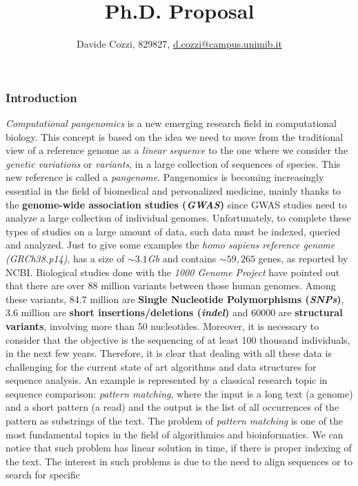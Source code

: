 \documentclass[a4paper,11pt, oneside]{article}
\title{\vspace{-1.75cm}Ph.D. Proposal}
\author{Davide Cozzi, 829827,
  \href{mailto:d.cozzi@campus.unimib.it}{d.cozzi@campus.unimib.it}}
\date{}
\begin{document}
\maketitle
{}
\subsubsection*{Introduction}
\textit{Computational pangenomics} is a new emerging research field in
computational biology. This concept is based on the idea we need to move
from the traditional view of a reference genome as a \textit{linear sequence} to
the one where we consider the \textit{genetic variations} or \textit{variants},
in a large collection of sequences of species. This new reference is called a
\emph{pangenome}.  
Pangenomics is becoming increasingly essential in the
field of biomedical and personalized medicine, mainly thanks to the
\textbf{genome-wide association studies (\textit{GWAS})} since GWAS studies need
to analyze a large collection of individual genomes.  Unfortunately, to complete
these types of studies on a large amount of data, such data 
must be indexed, queried and analyzed. Just to give some examples the
\textit{homo sapiens reference genome (GRCh38.p14)}, 
has a size of $\sim 3.1$\textit{Gb} and contains $\sim 59,265$ genes, as
reported by NCBI. Biological studies done with the \textit{1000 Genome Project}
have pointed out that there are over 88 
million variants between those human genomes. Among these variants, 84.7 million
are \textbf{Single Nucleotide Polymorphisms (\textit{SNPs})}, 3.6 million are
\textbf{short insertions/deletions (\textit{indel})} and 60000 are
\textbf{structural variants}, involving more than 50 nucleotides. Moreover, it
is necessary to consider that the objective is the sequencing of at least 100
thousand individuals, in the next few years. Therefore, it is clear that dealing
with  all these data is challenging for the current state of art algorithms and
data structures for sequence analysis. 
An example is represented by a classical research topic in sequence comparison:
\textit{pattern matching}, where the input is a long text (a
genome) and a short pattern (a read) and the output is the list of all
occurrences of the pattern as substrings of the text.  
The problem of \textit{pattern matching} is one of the most
fundamental topics in 
the field of algorithmics and bioinformatics. We can notice that such problem
has linear solution in time, if there is proper indexing of the text. The
interest in such 
problems is due to the need to align sequences or to search for specific
\end{document}

